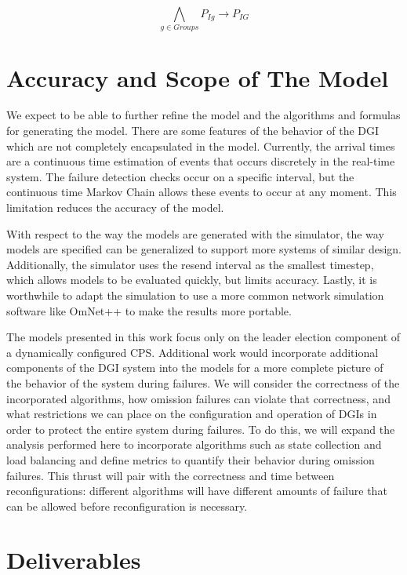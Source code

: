 \begin{equation}
\bigwedge_{g \in Groups}P_{Ig} \rightarrow P_{IG}
\end{equation}


\section{Accuracy and Scope of The Model}

We expect to be able to further refine the model and the algorithms and formulas for generating the model.
There are some features of the behavior of the DGI which are not completely encapsulated in the model.
Currently, the arrival times are a continuous time estimation of events that occurs discretely in the real-time system.
The failure detection checks occur on a specific interval, but the continuous time Markov Chain allows these events to occur at any moment.
This limitation reduces the accuracy of the model.

With respect to the way the models are generated with the simulator, the way models are specified can be generalized to support more systems of similar design.
Additionally, the simulator uses the resend interval as the smallest timestep, which allows models to be evaluated quickly, but limits accuracy.
Lastly, it is worthwhile to adapt the simulation to use a more common network simulation software like OmNet++ to make the results more portable.

The models presented in this work focus only on the leader election component of a dynamically configured CPS.
Additional work would incorporate additional components of the DGI system into the models for a more complete picture of the behavior of the system during failures.
We will consider the correctness of the incorporated algorithms, how omission failures can violate that correctness, and what restrictions we can place on the configuration and operation of DGIs in order to protect the entire system during failures.
To do this, we will expand the analysis performed here to incorporate algorithms such as state collection and load balancing and define metrics to quantify their behavior during omission failures.
This thrust will pair with the correctness and time between reconfigurations: different algorithms will have different amounts of failure that can be allowed before reconfiguration is necessary.

\section{Deliverables}


